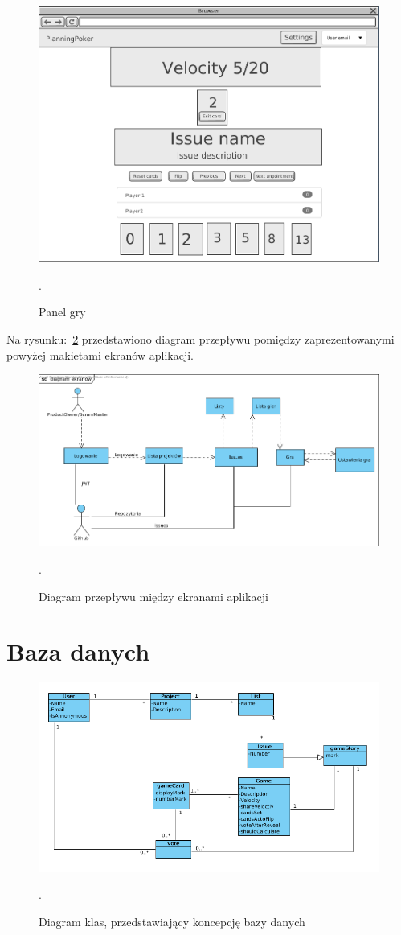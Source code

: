 \begin{figure}[H]
	\centering\includegraphics[width=.7\textwidth]{img/GameScreen.png}
	\caption{Panel gry}.\label{rys:GameScreen}
\end{figure}

Na rysunku:~\ref{rys:ScreensDiagram} przedstawiono diagram przepływu pomiędzy
zaprezentowanymi powyżej makietami ekranów aplikacji.

\begin{figure}[H]
	\centering\includegraphics[width=\textwidth]{img/ScreensDiagram.png}
	\caption{Diagram przepływu między ekranami aplikacji}.\label{rys:ScreensDiagram}
\end{figure}

\section{Baza danych}

\begin{figure}[H]
	\centering\includegraphics[width=\textwidth]{img/ClassDiagram.png}
	\caption{Diagram klas, przedstawiający koncepcję bazy danych}.\label{rys:ClassDiagram}
\end{figure}


